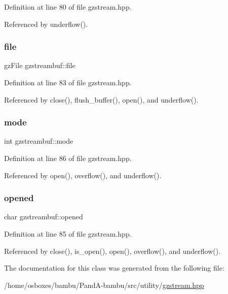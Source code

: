 Definition at line 80 of file gzstream.\+hpp.



Referenced by underflow().

\mbox{\label{classgzstreambuf_a9518df5885cfa63af6ba3496f7946d5f}} 
\subsubsection{\texorpdfstring{file}{file}}
{\footnotesize\ttfamily gz\+File gzstreambuf\+::file\hspace{0.3cm}{\ttfamily [private]}}



Definition at line 83 of file gzstream.\+hpp.



Referenced by close(), flush\+\_\+buffer(), open(), and underflow().

\mbox{\label{classgzstreambuf_adddc98d7ed861e936f47fdd9d4a137f7}} 
\subsubsection{\texorpdfstring{mode}{mode}}
{\footnotesize\ttfamily int gzstreambuf\+::mode\hspace{0.3cm}{\ttfamily [private]}}



Definition at line 86 of file gzstream.\+hpp.



Referenced by open(), overflow(), and underflow().

\mbox{\label{classgzstreambuf_a233a824915fa1a54df05ecf33b8b78d2}} 
\subsubsection{\texorpdfstring{opened}{opened}}
{\footnotesize\ttfamily char gzstreambuf\+::opened\hspace{0.3cm}{\ttfamily [private]}}



Definition at line 85 of file gzstream.\+hpp.



Referenced by close(), is\+\_\+open(), open(), overflow(), and underflow().



The documentation for this class was generated from the following file\+:\begin{DoxyCompactItemize}
\item 
/home/osboxes/bambu/\+Pand\+A-\/bambu/src/utility/\hyperlink{gzstream_8hpp}{gzstream.\+hpp}\end{DoxyCompactItemize}
